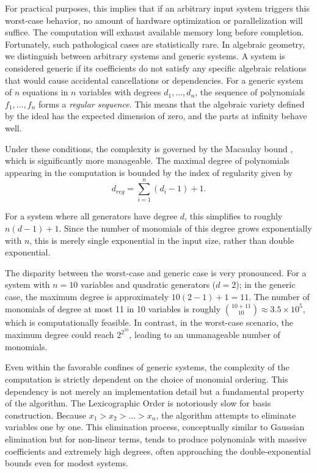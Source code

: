 For practical purposes, this implies that if an arbitrary input system triggers this worst-case behavior, no amount of hardware optimization or parallelization will suffice. The computation will exhaust available memory long before completion. Fortunately, such pathological cases are statistically rare. In algebraic geometry, we distinguish between arbitrary systems and generic systems. A system is considered generic if its coefficients do not satisfy any specific algebraic relations that would cause accidental cancellations or dependencies. For a generic system of $n$ equations in $n$ variables with degrees $d_1, \dots, d_n$, the sequence of polynomials $f_1, \dots, f_n$ forms a \textit{regular sequence}. This means that the algebraic variety defined by the ideal has the expected dimension of zero, and the parts at infinity behave well.

Under these conditions, the complexity is governed by the Macaulay bound \cite{MacAulay1927_MacaulayBound,Stanley1975_UpperBoundConjecture}, which is significantly more manageable. The maximal degree of polynomials appearing in the computation is bounded by the index of regularity given by
$$
d_{reg} = \sum_{i=1}^{n} (d_i - 1) + 1.
$$

For a system where all generators have degree $d$, this simplifies to roughly $n(d-1) + 1$. Since the number of monomials of this degree grows exponentially with $n$, this is merely single exponential in the input size, rather than double exponential.

\begin{remark}
The disparity between the worst-case and generic case is very pronounced. For a system with $n=10$ variables and quadratic generators ($d=2$); in the generic case, the maximum degree is approximately $10(2-1) + 1 = 11$. The number of monomials of degree at most 11 in 10 variables is roughly $\binom{10+11}{10} \approx 3.5 \times 10^5$, which is computationally feasible. In contrast, in the worst-case scenario, the maximum degree could reach $2^{2^{10}}$, leading to an unmanageable number of monomials.
\end{remark}

Even within the favorable confines of generic systems, the complexity of the computation is strictly dependent on the choice of monomial ordering. This dependency is not merely an implementation detail but a fundamental property of the algorithm. The Lexicographic Order is notoriously slow for basis construction. Because $x_1 > x_2 > \dots > x_n$, the algorithm attempts to eliminate variables one by one. This elimination process, conceptually similar to Gaussian elimination but for non-linear terms, tends to produce polynomials with massive coefficients and extremely high degrees, often approaching the double-exponential bounds even for modest systems. 

